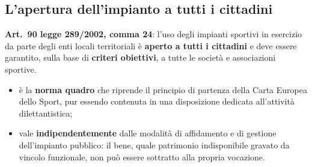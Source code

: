 \subsection{L'apertura dell'impianto a tutti i cittadini}

\textbf{Art.\ 90 legge 289/2002, comma 24}: l'uso degli impianti sportivi in esercizio da parte
degli enti locali territoriali è \textbf{aperto a tutti i cittadini} e deve essere garantito, sulla
base di \textbf{criteri obiettivi}, a tutte le società e associazioni sportive.

\begin{itemize}
  \item è la \textbf{norma quadro} che riprende il principio di partenza della Carta Europea dello
    Sport, pur essendo contenuta in una disposizione dedicata all'attività dilettantistica;
  \item vale \textbf{indipendentemente} dalle modalità di affidamento e di gestione dell'impianto
    pubblico: il bene, quale patrimonio indisponibile gravato da vincolo funzionale, non può
    essere sottratto alla propria vocazione.
\end{itemize}
